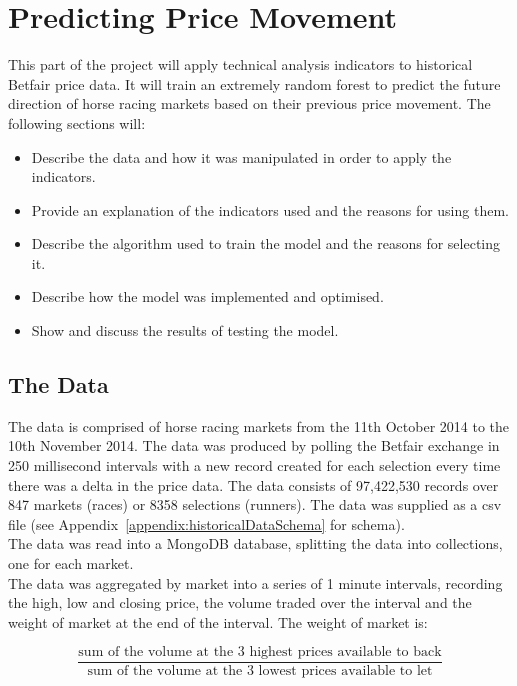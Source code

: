 \chapter{Predicting Price Movement}
	This part of the project will apply technical analysis indicators to historical Betfair price data. It will train an extremely random forest to predict the future direction of horse racing markets based on their previous price movement. The following sections will:\\
	
	\begin{itemize}
		\item Describe the data and how it was manipulated in order to apply the indicators.
		\item Provide an explanation of the indicators used and the reasons for using them.
		\item Describe the algorithm used to train the model and the reasons for selecting it.
		\item Describe how the model was implemented and optimised.
		\item Show and discuss the results of testing the model.
	\end{itemize}
	
	\section{The Data}
	The data is comprised of horse racing markets from the 11th October 2014 to the 10th November 2014. The data was produced by polling the Betfair exchange in 250 millisecond intervals with a new record created for each selection every time there was a delta in the price data. The data consists of 97,422,530 records over 847 markets (races) or 8358 selections (runners). The data was supplied as a csv file (see Appendix~\ref{appendix:historicalDataSchema} for schema).\\
	
	The data was read into a MongoDB database, splitting the data into collections, one for each market.\\ 
	
	The data was aggregated by market into a series of 1 minute intervals, recording the high, low and closing price, the volume traded over the interval and the weight of market at the end of the interval. The weight of market is:
		
		$$\frac{\text{sum of the volume at the 3 highest prices available to back}}{\text{sum of the volume at the 3 lowest prices available to let}}$$
		
